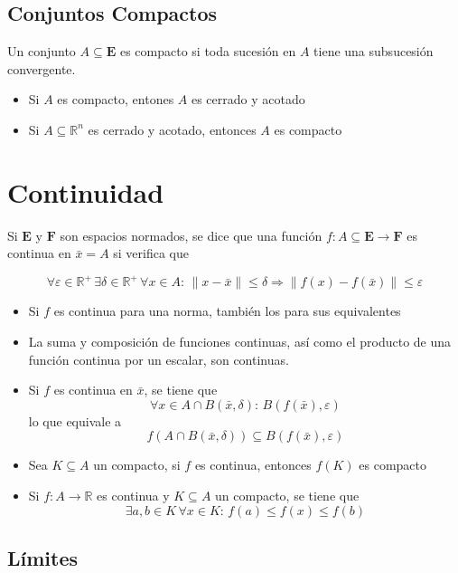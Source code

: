 \subsection{Conjuntos Compactos}

Un conjunto $A\subseteq\mathbf{E}$ es compacto si toda sucesión en $A$ tiene una subsucesión convergente.

\begin{itemize}
    \item Si $A$ es compacto, entones $A$ es cerrado y acotado
    \item Si $A\subseteq\mathbb{R}^n$ es cerrado y acotado, entonces $A$ es compacto
\end{itemize}

\section{Continuidad}

Si $\mathbf{E}$ y $\mathbf{F}$ son espacios normados, se dice que una función $f:A\subseteq\mathbf{E}\to\mathbf{F}$ es continua en $\bar{x}=A$ si verifica que

\[\forall\varepsilon\in\mathbb{R}^+\,\exists\delta\in
\mathbb{R}^+\,\forall x\in A:\, \|x-\bar{x}\|\leq \delta \Rightarrow \|f(x)-f(\bar{x})\|\leq \varepsilon\]

\begin{itemize}
    \item Si $f$ es continua para una norma, también los para sus equivalentes
    \item La suma y composición de funciones continuas, así como el producto de una función continua por un escalar, son continuas.
    \item Si $f$ es continua en $\bar{x}$, se tiene que
    \[\forall x\in A\cap B(\bar{x},\delta):\,B(f(\bar{x}),\varepsilon)\]
    lo que equivale a
    \[f(A\cap B(\bar{x}, \delta))\subseteq B(f(\bar{x}),\varepsilon)\]
    \item Sea $K\subseteq A$ un compacto, si $f$ es continua, entonces $f(K)$ es compacto
    \item Si $f:A\to\mathbb{R}$ es continua y $K\subseteq A$ un compacto, se tiene que
    \[\exists a,b\in K\,\forall x\in K:\, f(a)\leq f(x)
    \leq f(b)\]
\end{itemize}

\subsection{Límites}

